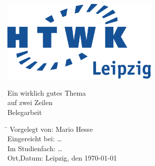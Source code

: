 \documentclass[12pt,a4paper]{scrartcl}
\begin{document}
	
	\ohead{\pagemark}
	\ihead{\sectionmark}
	\cfoot{}
	\pagestyle{scrheadings}
	\renewcommand{\sectionmark}[1]{\markright{#1}{}}
	
	\begin{titlepage}
		
		\begin{center}
			\includegraphics[height=4cm]{Bilder/HTWK_Logo_CMYK}
			
			\vspace*{3cm}
			
			{\sc \LARGE Ein wirklich gutes Thema\\ auf zwei Zeilen}\\
			\vspace{1cm}
			{\sc \Large Belegarbeit}\\
		\end{center}
		
		\vspace{8cm}
		
		\begin{tabbing}
			\hspace{4cm}\=\kill
			Vorgelegt von:		\> Mario Hesse \\
			Eingereicht bei:	\> \dots \\ 
			Im Studienfach:		\> \dots \\
			Ort,Datum:			\> Leipzig, den \today
		\end{tabbing} 
		
	\end{titlepage}
	
	
\end{document}
